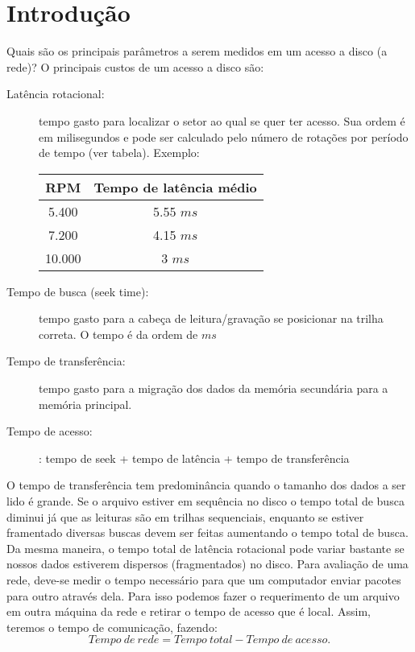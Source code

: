 \documentclass[11pt,a4paper]{article}
\begin{document}
\section{Introdução}
Quais são os principais parâmetros a serem medidos em um acesso a
disco (a rede)?
O principais custos de um acesso a disco são:
\begin{description}
\item [Latência rotacional:] tempo gasto para localizar o 
setor ao qual se quer ter acesso. Sua ordem é em milisegundos e pode
ser calculado pelo número de rotações por período de tempo (ver
tabela). Exemplo:

\begin{table}[h!]
\begin{center}
\begin{tabular}{cc}
\hline
\hline
RPM &  Tempo de latência médio \\
\hline
5.400 & 5.55 $ms$ \\
7.200 & 4.15 $ms$\\
10.000 & 3 $ms$
\end{tabular}
\end{center}
\end{table}

\item [Tempo de busca (seek time):] tempo gasto para a cabeça de 
leitura/gravação se posicionar na trilha correta. O tempo é da ordem de $ms$

\item[Tempo de transferência:]  tempo gasto para a 
migração dos dados da memória secundária para a 
memória principal.

\item[Tempo de acesso:]: tempo de seek + tempo de latência + tempo de transferência
\end{description}

O tempo de transferência tem predominância quando o tamanho dos dados
a ser lido é grande.
Se o arquivo estiver em sequência no disco o tempo total de busca diminui
já que as leituras são em trilhas sequenciais, enquanto se estiver
framentado diversas buscas devem ser feitas aumentando o tempo total
de busca.
Da mesma maneira, o tempo total de latência rotacional pode variar bastante
se nossos dados estiverem dispersos (fragmentados) no disco. 
Para  avaliação de uma rede, deve-se medir o tempo necessário para que um computador
enviar pacotes para outro através dela. Para isso podemos fazer o requerimento 
de um arquivo em outra máquina da rede e retirar o tempo de acesso que é local.
Assim, teremos o tempo de comunicação, fazendo:
\begin{equation}
  Tempo~de~rede = Tempo~total - Tempo~de~acesso. 
\end{equation}
\end{document}
